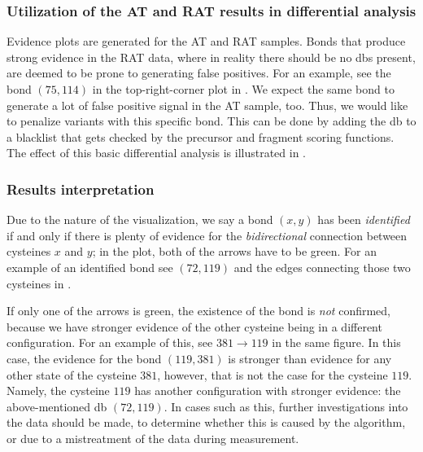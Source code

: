 \subsubsection{Utilization of the AT and RAT results in differential analysis}\label{sec:diff}

Evidence plots are generated for the AT and RAT samples. Bonds that produce strong evidence in the RAT data, where in reality there should be no \glspl*{db} present, are deemed to be prone to generating false positives. For an example, see the bond \((75, 114)\) in the top-right-corner plot in . We expect the same bond to generate a lot of false positive signal in the AT sample, too. Thus, we would like to penalize variants with this specific bond. This can be done by adding the \gls*{db} to a blacklist that gets checked by the precursor and fragment scoring functions. The effect of this basic differential analysis is illustrated in .

\subsubsection{Results interpretation}\label{sec:interpretation}

Due to the nature of the visualization, we say a bond \((x, y)\) has been \emph{identified} if and only if there is plenty of evidence for the \emph{bidirectional} connection between cysteines \(x\) and \(y\); in the plot, both of the arrows have to be green. For an example of an identified bond see \((72, 119)\) and the edges connecting those two cysteines in .

If only one of the arrows is green, the existence of the bond is \emph{not} confirmed, because we have stronger evidence of the other cysteine being in a different configuration. For an example of this, see \(381 \to 119\) in the same figure. In this case, the evidence for the bond \((119, 381)\) is stronger than evidence for any other state of the cysteine \(381\), however, that is not the case for the cysteine \(119\). Namely, the cysteine \(119\) has another configuration with stronger evidence: the above-mentioned \gls*{db} \((72, 119)\). In cases such as this, further investigations into the data should be made, to determine whether this is caused by the algorithm, or due to a mistreatment of the data during measurement.